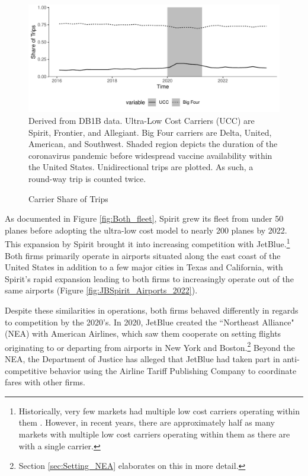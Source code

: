 \documentclass{article}
\begin{document}
    	\begin{figure}
		\caption{Carrier Share of Trips}
		\label{fig:ULCC_Trips}
		\includegraphics[width = \linewidth]{Carrier_Share}
		\footnotesize{Derived from DB1B data. Ultra-Low Cost Carriers (UCC) are Spirit, Frontier, and Allegiant. Big Four carriers are Delta, United, American, and Southwest. Shaded region depicts the duration of the coronavirus pandemic before widespread vaccine availability within the United States. Unidirectional trips are plotted. As such, a round-way trip is counted twice.}
	\end{figure}
	
	 As documented in Figure \ref{fig:Both_fleet}, Spirit grew its fleet from under 50 planes before adopting the ultra-low cost model to nearly 200 planes by 2022. This expansion by Spirit brought it into increasing competition with JetBlue.\footnote{Historically, very few markets had multiple low cost carriers operating within them \citep{kwoka_fringe_2016, ciliberto_market_2021}. However, in recent years, there are approximately half as many markets with multiple low cost carriers operating within them as there are with a single carrier.} Both firms primarily operate in airports situated along the east coast of the United States in addition to a few major cities in Texas and California, with Spirit's rapid expansion leading to both firms to increasingly operate out of the same airports (Figure \ref{fig:JBSpirit_Airports_2022}).
	
	Despite these similarities in operations, both firms behaved differently in regards to competition by the 2020's.  In 2020, JetBlue created the ``Northeast Alliance" (NEA) with American Airlines, which saw them cooperate on setting flights originating to or departing from airports in New York and Boston.\footnote{Section \ref{sec:Setting_NEA} elaborates on this in more detail.} Beyond the NEA, the Department of Justice has alleged that JetBlue had taken part in anti-competitive behavior using the Airline Tariff Publishing Company to coordinate fares with other firms. 
	
\end{document}
